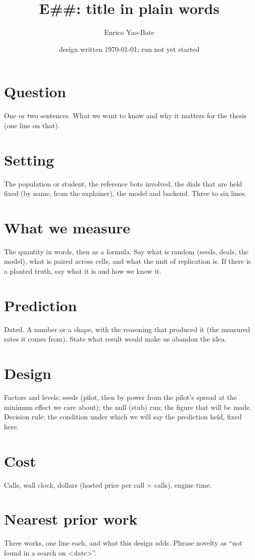 \documentclass[11pt]{article}
\title{E\#\#: title in plain words}
\author{Enrico Yao-Bate}
\date{design written \today; run not yet started}
\begin{document}
\maketitle

\section{Question}
One or two sentences. What we want to know and why it matters for the thesis (one line on that).

\section{Setting}
The population or student, the reference bots involved, the dials that are held fixed (by name, from the
explainer), the model and backend. Three to six lines.

\section{What we measure}
The quantity in words, then as a formula. Say what is random (seeds, deals, the model), what is paired across
cells, and what the unit of replication is. If there is a planted truth, say what it is and how we know it.

\section{Prediction}
Dated. A number or a shape, with the reasoning that produced it (the measured rates it comes from). State what
result would make us abandon the idea.

\section{Design}
Factors and levels; seeds (pilot, then by power from the pilot's spread at the minimum effect we care about);
the null (stub) run; the figure that will be made. Decision rule: the condition under which we will say the
prediction held, fixed here.

\section{Cost}
Calls, wall clock, dollars (hosted price per call $\times$ calls), engine time.

\section{Nearest prior work}
Three works, one line each, and what this design adds. Phrase novelty as ``not found in a search on <date>''.
\end{document}
